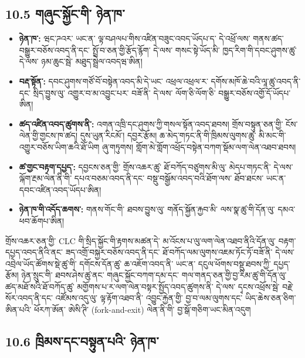 \documentclass[11pt]{article}
\begin{document}
\subsection*{10.5 གཞུང་སྐྱོང་གི་ ཉེན་ཁ་}

\begin{itemize}[leftmargin=*]
\item \textbf{ཉེན་ཁ་:} ཝང་ཌའར་ ཡང་ན་ ལྟ་བཤལཔ་གིས་འཛིན་བཟུང་འབད་ཡོདཔ་ད་ དེ་འཕྲོ་ལས་ གནས་ཚད་བསྒྱུར་བཅོས་འབད་ནི་དང་ སྤྲོ་བ་ཅན་གྱི་རྩོད་རྙོག་ དེ་ལས་ གསང་སྟེ་ཡོད་མི་ ཁྱད་རིག་གི་དབང་ཤུགས་ཚུ་ དེ་ལས་ ཉམ་ཆུང་སྦེ་ མཐུད་སྦྲེལ་འབདཝ་ཨིན།
\item \textbf{བརྡ་སྟོན་:} དབང་ཤུགས་གཙོ་བོ་བསྟེན་འབད་མི་དེ་ཡང་ འཕྲལ་འཕྲལ་ར་ དགོས་མཁོ་ཆེ་བའི་ལཱ་ཚུ་འབད་ནི་དང་ སྲིད་བྱུས་ལུ་ འགྱུར་བ་མ་འབྱུང་པར་ བཟོ་ནི་ དེ་ལས་ ལོག་ཅི་ལོག་ཅི་ བསྒྱུར་བཅོས་འགྱོ་དོ་ཡོདཔ་ཨིན།
\item \textbf{ཚད་འཛིན་འབད་ཚུགས་ནི་:} འགན་འཁྲི་དང་ཤུགས་ཀྱི་གསལ་སྟོན་འབད་ཐབས། གྲོས་བསྟུན་ཅན་གྱི་ ངོས་ལེན་གྱི་གྱངས་ཁ་ཚད། དུས་ཡུན་རིངམོ་། དབྱར་རྩོམ། ཆ་མེད་གཏང་ནི་གི་ཁྲིམས་ལུགས་ཚུ་ མི་མང་གི་འགྱུར་བཅོས་ཡིག་ཆའི་ཐོ་ཡིག ཞུ་གཏུགས། གློག་མེ་གློག་འཕྲོད་བསྟེན་བཀག་སྡོམ་ལག་ལེན་འཐབ་ཐབས།
\item \textbf{ཚ་གྱང་བརྟག་དཔྱད་:} དབྱངས་ཅན་གྱི་ གྲོས་འཆར་ཚུ་ ཐོ་བཀོད་བཙུགས་མི་ལུ་ མེདཔ་གཏང་ནི་ དེ་ལས་ ལྐོག་རྔམ་ལེན་ནི་གི་ དཔའ་བཅམ་འབད་ནི་དང་ བསྡུ་བསྒྱོམ་འབད་བའི་ཐོག་ལས་ ཐོབ་ཐངས་ ཡང་ན་ དབང་འཛིན་འབད་ཡོདཔ་ཨིན།
\item \textbf{ཉེན་ཁ་གི་འདོད་ཆགས་:} གནས་གོང་གི་ ཐབས་བྱུས་ལུ་ གནོད་སྐྱོན་རྐྱབ་མི་ ལས་སྣ་ཚུ་གི་དོན་ལུ་ དམའ་ཕབ་ཆོགཔ་ཨིན།
\end{itemize}
གྲོས་འཆར་ཅན་གྱི་ CLC གི་སྲིད་སྐྱོང་གི་རྟགས་མཚན་དེ་ མ་འོངས་པ་ལུ་ལག་ལེན་འཐབ་ནིའི་དོན་ལུ་ བརྟག་དཔྱད་འབད་ནིའི་ནང་ ཟད་འགྲོ་བསྐྱར་བཅོས་འབད་ནི་དང་ ཐོ་བཀོད་ལམ་ལུགས་འཇམ་ཏོང་ཏོ་བཟོ་ནི་ དེ་ལས་ འབྲེལ་ཡོད་ཚོགས་སྡེ་ཚུ་གི་ དགོངས་དོན་ཚུ་ ཆ་འཇོག་འབད་ནི་ ཡང་ན་ དངུལ་ཕོགས་བསྡུ་ཐབས་ཀྱི་ དཔྱད་རྩོམ། ཉེན་སྲུང་གི་ ཐབས་ཤེས་ཚུ་ནང་ གཞུང་སྐྱོང་བཀག་དམ་དང་ གལ་གནད་ཅན་གྱི་བྱ་རིམ་ཚུ་གི་དོན་ལུ་ ཚད་མཐོ་སའི་ཐོ་བཀོད་ཚུ་ མགྱོགས་པ་ར་ལག་ལེན་བསྟར་སྤྱོད་འབད་ཚུགས་ནི་ དེ་ལས་ དྭངས་འཕྲོས་སྦེ་ བརྗེ་སོར་འབད་ནི་དང་ འཛོམས་འདུ་ལུ་ ལྟ་རྟོག་འཐབ་ནི་ འབྱུང་རྐྱེན་གྱི་ བྱ་བ་ལམ་ལུགས་དང་ ཡིད་ཆེས་ཅན་ཅིག་ཨིན་པའི་ ཕོརཀ་ཨོན་ ཨེསི་ཊི་ (fork-and-exit) ལེན་ནི་གི་ བྱ་སྒོ་གཅིག་ཡང་མིན་འདུག

\subsection*{10.6 ཁྲིམས་དང་བསྟུན་པའི་ ཉེན་ཁ་}
\end{document}
